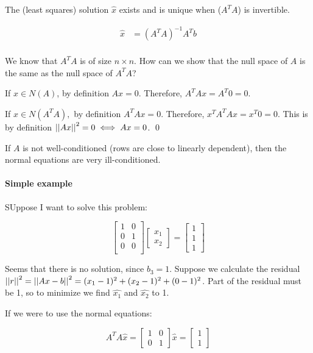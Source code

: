 The (least squares) solution $\hat{x}$ exists and is unique when ($A^TA$) is invertible.

\begin{align*}
  \hat{x} &= (A^TA)^{-1} A^T b \\
\end{align*}

We know that $A^TA$ is of size $n \times n$. How can we show that the null space of $A$ is the same as the null space of $A^TA$?

\proof If $x\in N(A)$, by definition $Ax = 0$. Therefore, $A^TAx = A^T 0 = 0$.

If $x \in N(A^TA),$ by definition $A^TAx = 0$. Therefore, $x^TA^TAx = x^T 0 = 0$. This is by definition $\left|\left|Ax\right|\right|^2 = 0 \iff Ax = 0$. \qed

If $A$ is not well-conditioned (rows are close to linearly dependent), then the normal equations are very ill-conditioned.

\paragraph{Simple example} SUppose I want to solve this problem:

\[
  \begin{bmatrix}
    1 & 0 \\
    0 & 1 \\
    0 & 0 \\
  \end{bmatrix}
  \begin{bmatrix}
    x_1 \\ x_2
  \end{bmatrix}
  =
  \begin{bmatrix}
    1 \\ 1 \\ 1
  \end{bmatrix}
\]

Seems that there is no solution, since $b_3 = 1$. Suppose we calculate the residual $\left|\left|r\right|\right|^2 = \left|\left|Ax - b\right|\right|^2 = (x_1 - 1)^2 + (x_2 - 1)^2 + (0-1)^2$. Part of the residual must be 1, so to minimize we find $\hat{x_1}$ and $\hat{x_2}$ to 1.

If we were to use the normal equations:

\[
  A^T A \hat{x} = \begin{bmatrix}
    1 & 0 \\ 0 & 1
  \end{bmatrix} \hat{x}
  =
  \begin{bmatrix}
    1 \\ 1
  \end{bmatrix}
\]


